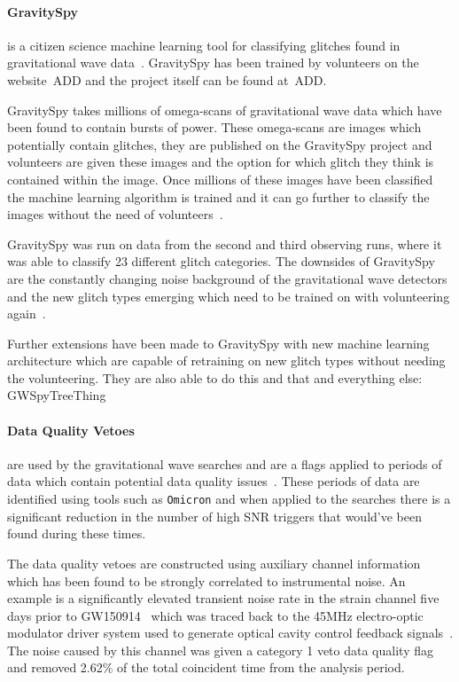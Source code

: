 \paragraph{GravitySpy}

is a citizen science machine learning tool for classifying glitches found in gravitational wave data~\cite{gravityspy:2017}. GravitySpy has been trained by volunteers on the website~ADD and the project itself can be found at~ADD.

GravitySpy takes millions of omega-scans of gravitational wave data which have been found to contain bursts of power. These omega-scans are images which potentially contain glitches, they are published on the GravitySpy project and volunteers are given these images and the option for which glitch they think is contained within the image. Once millions of these images have been classified the machine learning algorithm is trained and it can go further to classify the images without the need of volunteers~\cite{gravityspy:2021}.

GravitySpy was run on data from the second and third observing runs, where it was able to classify 23 different glitch categories. The downsides of GravitySpy are the constantly changing noise background of the gravitational wave detectors and the new glitch types emerging which need to be trained on with volunteering again~\cite{gravityspy:2023}.

Further extensions have been made to GravitySpy with new machine learning architecture which are capable of retraining on new glitch types without needing the volunteering. They are also able to do this and that and everything else: GWSpyTreeThing~\cite{GSpyNetTree:2023}


\paragraph{Data Quality Vetoes}

are used by the gravitational wave searches and are a flags applied to periods of data which contain potential data quality issues~\cite{DQ_vetoes:2017}. These periods of data are identified using tools such as \verb|Omicron| and when applied to the searches there is a significant reduction in the number of high SNR triggers that would've been found during these times.

The data quality vetoes are constructed using auxiliary channel information which has been found to be strongly correlated to instrumental noise. An example is a significantly elevated transient noise rate in the strain channel five days prior to GW150914~\cite{GW150914:2016} which was traced back to the 45MHz electro-optic modulator driver system used to generate optical cavity control feedback signals~\cite{aLIGO:2015}. The noise caused by this channel was given a category 1 veto data quality flag and removed 2.62\% of the total coincident time from the analysis period.

